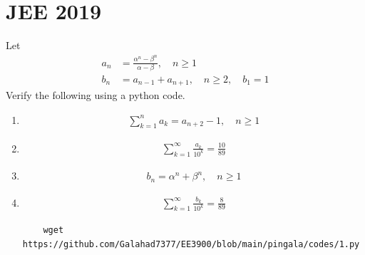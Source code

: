 \documentclass[journal,12pt,twocolumn]{IEEEtran}
\renewcommand\thesection{\arabic{section}}
\begin{document}
\section{JEE 2019}
Let 
\begin{align}
	a_n &= \frac{\alpha^{n}-\beta^{n}}{\alpha - \beta}, \quad n \ge 1
	\\
	b_n &= a_{n-1} + a_{n+1}, \quad n \ge 2, \quad b_1 =1
	\label{eq:10-orig-diff}
\end{align}
Verify the following using a python code.
\begin{enumerate}[label=\thesection.\arabic*
,ref=\thesection.\theenumi]
\item 
\begin{align}
	\sum_{k=1}^{n}a_k = a_{n+2}-1, \quad n \ge 1
\end{align}
 \item 
\begin{align}
	\sum_{k=1}^{\infty}\frac{a_k}{10^k} =\frac{10}{89}
\end{align}
 \item 
\begin{align}
	b_n =\alpha^n + \beta^n, \quad n \ge 1
\end{align}
 \item 
\begin{align}
	\sum_{k=1}^{\infty}\frac{b_k}{10^k} =\frac{8}{89}
\end{align}
\solution
\begin{lstlisting}
    wget https://github.com/Galahad7377/EE3900/blob/main/pingala/codes/1.py
\end{lstlisting}
\end{enumerate}
\end{document}

